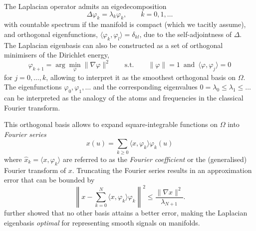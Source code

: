 The Laplacian operator admits an eigedecomposition %
$$
\Delta \varphi_k = \lambda_k \varphi_k, \quad\quad k=0, 1, \hdots 
$$
%
with countable spectrum if the manifold is compact (which we tacitly assume), and orthogonal eigenfunctions, $\langle \varphi_k, \varphi_l \rangle = \delta_{kl}$, due to the self-adjointness of $\Delta$. 
%
The Laplacian eigenbasis can also be constructed as a set of orthogonal minimisers of the Dirichlet energy, 
$$
\varphi_{k+1} = \arg\min_{\varphi} \| \nabla \varphi \|^2      \quad\quad \text{s.t.}\quad\quad   \|\varphi \|=1 \,\,\, \text{and} \,\,\, \langle \varphi, \varphi_{j} \rangle = 0 
$$
for $j=0,\hdots, k$, allowing to interpret it as the smoothest orthogonal basis on $\Omega$. 
%
The eigenfunctions $\varphi_0, \varphi_1, \hdots$ and the corresponding eigenvalues $0 = \lambda_0 \leq \lambda_1 \leq \hdots $ can be interpreted as the analogy of the atoms and frequencies in the classical Fourier transform. 
%


This orthogonal basis allows to expand square-integrable functions on $\Omega$ into {\em Fourier series}  
$$
x (u) = \sum_{k \geq 0} \langle x, \varphi_k \rangle \varphi_k (u)
$$
%
where $\hat{x}_k = \langle x, \varphi_k \rangle$ are referred to as the {\em Fourier coefficient} or the (generalised) Fourier transform of $x$. 
%
Truncating the Fourier series results in an approximation error that can be bounded \citep{aflalo2013spectral} by 
$$
\left\| x - \sum_{k = 0}^N \langle x, \varphi_k \rangle \varphi_k \right\|^2 \leq \frac{\| \nabla x\|^2}{\lambda_{N+1}}.
$$
\cite{aflalo2015optimality} further showed that no other basis attains a better error, making the Laplacian eigenbasis  {\em optimal} for representing smooth signals on manifolds. 


